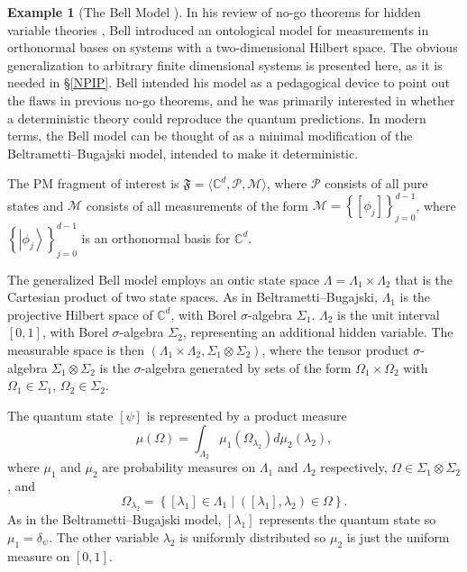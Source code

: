 \documentclass[DIV=calc,paper=a4,fontsize=11pt,twocolumn]{scrartcl} %
\theoremstyle{definition}
\newtheorem{example}[definition]{Example}
\theoremstyle{plain}
\newcommand{\Ket}[1]{\ensuremath{\left \vert #1 \right \rangle}}
\newcommand{\Proj}[1]{\ensuremath{\left [ #1 \right ]}}
\begin{document}
\begin{example}[The Bell Model \cite{Bell1966}]
\label{exa:EOM:Bell}
In his review of no-go theorems for hidden variable theories
\cite{Bell1966}, Bell introduced an ontological model for
measurements in orthonormal bases on systems with a two-dimensional
Hilbert space.  The obvious generalization to arbitrary finite
dimensional systems is presented here, as it is needed in
\S\ref{NPIP}.  Bell intended his model as a pedagogical device to
point out the flaws in previous no-go theorems, and he was primarily
interested in whether a deterministic theory could reproduce the
quantum predictions.  In modern terms, the Bell model can be thought
of as a minimal modification of the Beltrametti--Bugajski model,
intended to make it deterministic.

The PM fragment of interest is $\mathfrak{F} = \langle \mathbb{C}^d,
\mathcal{P}, \mathcal{M} \rangle$, where $\mathcal{P}$ consists of
all pure states and $\mathcal{M}$ consists of all measurements of
the form $\mathcal{M} = \left \{ \Proj{\phi_j} \right \}_{j=0}^{d-1}$,
where $\left \{ \Ket{\phi_j} \right \}_{j=0}^{d-1}$ is an orthonormal
basis for $\mathbb{C}^d$.

The generalized Bell model employs an ontic state space $\Lambda =
\Lambda_1 \times \Lambda_2$ that is the Cartesian product of two
state spaces.  As in Beltrametti--Bugajski, $\Lambda_1$ is the
projective Hilbert space of $\mathbb{C}^d$, with Borel
$\sigma$-algebra $\Sigma_1$.  $\Lambda_2$ is the unit interval
$[0,1]$, with Borel $\sigma$-algebra $\Sigma_2$, representing an
additional hidden variable.  The measurable space is then
$(\Lambda_1 \times \Lambda_2, \Sigma_1 \otimes \Sigma_2)$, where the
tensor product $\sigma$-algebra $\Sigma_1 \otimes \Sigma_2$ is the
$\sigma$-algebra generated by sets of the form $\Omega_1 \times
\Omega_2$ with $\Omega_1 \in \Sigma_1$, $\Omega_2 \in \Sigma_2$.

The quantum state $\Proj{\psi}$ is represented by a product measure
\begin{equation}
\mu(\Omega) = \int_{\Lambda_2} \mu_1(\Omega_{\lambda_2})
d\mu_2(\lambda_2),
\end{equation}
where $\mu_1$ and $\mu_2$ are probability measures on $\Lambda_1$
and $\Lambda_2$ respectively, $\Omega \in \Sigma_1 \otimes
\Sigma_2$, and
\begin{equation}
\Omega_{\lambda_2} = \left \{ \Proj{\lambda_1} \in
\Lambda_1 \middle | \left ( \Proj{\lambda_1}, \lambda_2 \right )
\in \Omega \right \}.
\end{equation}
As in the Beltrametti--Bugajski model, $\Proj{\lambda_1}$ represents
the quantum state so $\mu_1 = \delta_{\psi}$.  The other variable
$\lambda_2$ is uniformly distributed so $\mu_2$ is just the uniform
measure on $[0,1]$.


\end{example}
\end{document}
